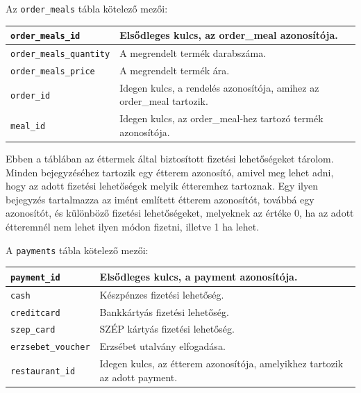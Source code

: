 \bigskip

\noindent Az \texttt{order\_meals} tábla kötelező mezői:

\bigskip

\begin{tabular}{|p{4.5cm}|p{8.5cm}|}
    \hline
    \texttt{order\_meals\_id} & Elsődleges kulcs, az order\_meal azonosítója. \\
    \hline
    \texttt{order\_meals\_quantity} & A megrendelt termék darabszáma. \\
    \hline
    \texttt{order\_meals\_price} & A megrendelt termék ára. \\
    \hline
    \texttt{order\_id} & Idegen kulcs, a rendelés azonosítója, amihez az order\_meal tartozik. \\
    \hline
    \texttt{meal\_id} & Idegen kulcs, az order\_meal-hez tartozó termék azonosítója. \\
    \hline
\end{tabular}


Ebben a táblában az éttermek által biztosított fizetési lehetőségeket tárolom. Minden bejegyzéséhez tartozik egy étterem azonosító, amivel meg lehet adni, hogy az adott fizetési lehetőségek melyik étteremhez tartoznak. Egy ilyen bejegyzés tartalmazza az imént említett étterem azonosítót, továbbá egy azonosítót, és különböző fizetési lehetőségeket, melyeknek az értéke 0, ha az adott étteremnél nem lehet ilyen módon fizetni, illetve 1 ha lehet.

\newpage

\noindent A \texttt{payments} tábla kötelező mezői:

\bigskip

\begin{tabular}{|p{4cm}|p{9cm}|}
    \hline
    \texttt{payment\_id} & Elsődleges kulcs, a payment azonosítója. \\
    \hline
    \texttt{cash} & Készpénzes fizetési lehetőség. \\
    \hline
    \texttt{creditcard} & Bankkártyás fizetési lehetőség. \\
    \hline
    \texttt{szep\_card} & SZÉP kártyás fizetési lehetőség. \\
    \hline
    \texttt{erzsebet\_voucher} & Erzsébet utalvány elfogadása. \\
    \hline
    \texttt{restaurant\_id} & Idegen kulcs, az étterem azonosítója, amelyikhez tartozik az adott payment. \\
    \hline
\end{tabular}

